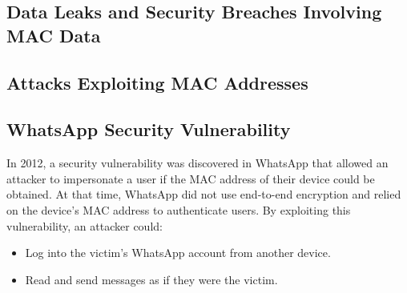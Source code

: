\documentclass[aps,prb,twocolumn,superscriptaddress,floatfix,longbibliography,nofootinbib]{revtex4-2}
\begin{document}
  \subsection{\label{subsec:DataLeaks}Data Leaks and Security Breaches Involving MAC Data}
  \subsection{\label{subsec: Attacks}Attacks Exploiting MAC Addresses}
  \subsection{\label{subsec:WhatsApp}WhatsApp Security Vulnerability}





In 2012, a security vulnerability was discovered in WhatsApp that allowed an attacker 
to impersonate a user if the MAC address of their device could be obtained. At that time,
WhatsApp did not use end-to-end encryption and relied on the device's MAC address to authenticate users.
By exploiting this vulnerability, an attacker could:
    \begin{itemize}
    \item Log into the victim's WhatsApp account from another device.
    \item Read and send messages as if they were the victim.
    \end{itemize}
\end{document}
